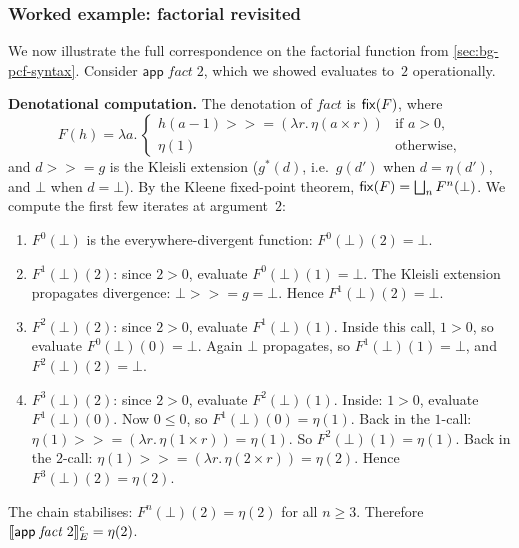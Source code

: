 \subsubsection*{Worked example: factorial revisited}

We now illustrate the full correspondence on the factorial function from
\cref{sec:bg-pcf-syntax}.  Consider $\mathsf{app}\;\mathit{fact}\;2$,
which we showed evaluates to~$2$ operationally.

\medskip\noindent
\textbf{Denotational computation.}\;
The denotation of $\mathit{fact}$ is $\mathsf{fix}(F)$, where
\[
  F(h) = \lambda a.\,
  \begin{cases}
    h(a - 1) \mathbin{>\!\!>\!\!=} (\lambda r.\, \eta(a \times r))
      & \text{if } a > 0, \\
    \eta(1) & \text{otherwise,}
  \end{cases}
\]
and $d \mathbin{>\!\!>\!\!=} g$ is the Kleisli extension
($g^\ast(d)$, i.e.\ $g(d')$ when $d = \eta(d')$, and $\bot$ when
$d = \bot$).
By the Kleene fixed-point theorem, $\mathsf{fix}(F) = \bigsqcup_n F^n(\bot)$.
We compute the first few iterates at argument~$2$:

\begin{enumerate}
  \item $F^0(\bot)$
    is the everywhere-divergent function: $F^0(\bot)(2) = \bot$.

  \item $F^1(\bot)(2)$: since $2 > 0$, evaluate
    $F^0(\bot)(1) = \bot$.  The Kleisli extension propagates
    divergence: $\bot \mathbin{>\!\!>\!\!=} g = \bot$.
    Hence $F^1(\bot)(2) = \bot$.

  \item $F^2(\bot)(2)$: since $2 > 0$, evaluate $F^1(\bot)(1)$.
    Inside this call, $1 > 0$, so evaluate $F^0(\bot)(0) = \bot$.
    Again $\bot$ propagates, so $F^1(\bot)(1) = \bot$, and
    $F^2(\bot)(2) = \bot$.

  \item $F^3(\bot)(2)$: since $2 > 0$, evaluate $F^2(\bot)(1)$.
    Inside: $1 > 0$, evaluate $F^1(\bot)(0)$.  Now $0 \leq 0$, so
    $F^1(\bot)(0) = \eta(1)$.  Back in the $1$-call:
    $\eta(1) \mathbin{>\!\!>\!\!=} (\lambda r.\, \eta(1 \times r))
    = \eta(1)$.  So $F^2(\bot)(1) = \eta(1)$.
    Back in the $2$-call:
    $\eta(1) \mathbin{>\!\!>\!\!=} (\lambda r.\, \eta(2 \times r))
    = \eta(2)$.  Hence $F^3(\bot)(2) = \eta(2)$.
\end{enumerate}

\noindent
The chain stabilises: $F^n(\bot)(2) = \eta(2)$ for all $n \geq 3$.
Therefore $\llbracket \mathsf{app}\;\mathit{fact}\;2 \rrbracket^c_E = \eta(2)$.

